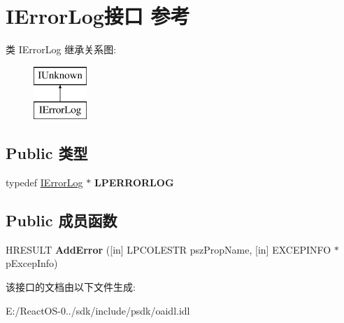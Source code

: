 \hypertarget{interface_i_error_log}{}\section{I\+Error\+Log接口 参考}
\label{interface_i_error_log}
类 I\+Error\+Log 继承关系图\+:\begin{figure}[H]
\begin{center}
\leavevmode
\includegraphics[height=2.000000cm]{interface_i_error_log}
\end{center}
\end{figure}
\subsection*{Public 类型}
\begin{DoxyCompactItemize}
\item 
\mbox{\label{interface_i_error_log_a36f852efc42b0c30abe13cd19fb7c082}} 
typedef \hyperlink{interface_i_error_log}{I\+Error\+Log} $\ast$ {\bfseries L\+P\+E\+R\+R\+O\+R\+L\+OG}
\end{DoxyCompactItemize}
\subsection*{Public 成员函数}
\begin{DoxyCompactItemize}
\item 
\mbox{\label{interface_i_error_log_ac2deb4cf7963f11e5ed18c27e66cd6a9}} 
H\+R\+E\+S\+U\+LT {\bfseries Add\+Error} (\mbox{[}in\mbox{]} L\+P\+C\+O\+L\+E\+S\+TR psz\+Prop\+Name, \mbox{[}in\mbox{]} E\+X\+C\+E\+P\+I\+N\+FO $\ast$p\+Excep\+Info)
\end{DoxyCompactItemize}


该接口的文档由以下文件生成\+:\begin{DoxyCompactItemize}
\item 
E\+:/\+React\+O\+S-\/0../sdk/include/psdk/oaidl.\+idl\end{DoxyCompactItemize}
